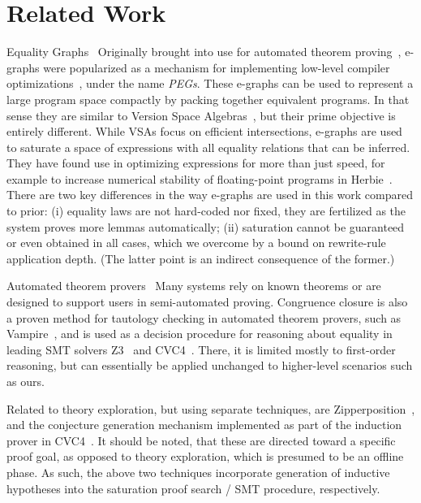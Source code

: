 \section{Related Work}
\label{thesy:related}

\begin{paragraph}{Equality Graphs}~
Originally brought into use for automated theorem proving~\cite{JACM2005:Detlefs},
e-graphs were popularized as a mechanism for implementing low-level compiler
optimizations~\cite{eqsat}, under the name \emph{PEGs}.
These e-graphs can be used to represent a large
program space compactly by packing together equivalent programs.
In that sense they are similar to Version Space 
Algebras~\cite{ML2003:Programming}, but their prime objective is entirely
different.
While VSAs focus on efficient intersections, e-graphs are used to saturate a
space of expressions with all equality relations that can be inferred.
They have found use in optimizing expressions for more than just speed,
for example to increase numerical stability of floating-point programs
in Herbie~\cite{herbie}.
There are two key differences in the way e-graphs are used in this work compared
to prior:
(i) equality laws are not hard-coded nor fixed, they are fertilized
as the system proves more lemmas automatically;
(ii) saturation cannot be guaranteed or even obtained in all cases, which we overcome by a bound on rewrite-rule application depth.
(The latter point is an indirect consequence of the former.)
\end{paragraph}

\begin{paragraph}{Automated theorem provers}~
Many systems rely on known theorems or are designed to support users in semi-automated proving.
Congruence closure is also a proven method for tautology checking in
automated theorem provers, such as Vampire~\cite{vampire},
and is used as a decision procedure for reasoning about equality in leading SMT solvers
Z3~\cite{z3} and CVC4~\cite{cvc4}.
There, it is limited mostly to first-order reasoning, but can essentially
be applied unchanged to higher-level scenarios such as ours.

Related to theory exploration, but using separate techniques,
are Zipperposition~\cite{FroCoS2017:Cruanes}, and the conjecture generation mechanism implemented as part of
the induction prover in CVC4~\cite{cvc4induction}.
It should be noted, that these are directed toward a specific proof goal, as opposed to theory exploration, which is presumed to be an offline phase.
As such, the above two techniques incorporate generation of inductive hypotheses into the saturation proof search / SMT procedure, respectively.
\end{paragraph}

